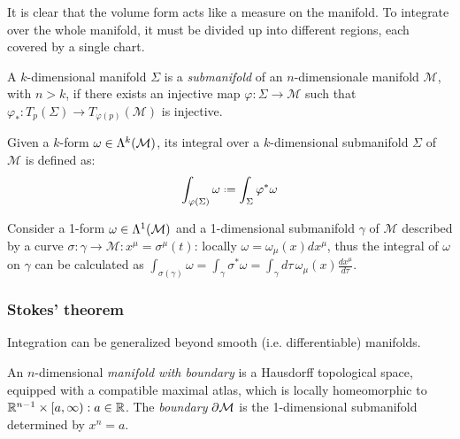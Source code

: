 It is clear that the volume form acts like a measure on the manifold. To integrate over the whole manifold, it must be divided up into different regions, each covered by a single chart.

\begin{definition}
  A $ k $-dimensional manifold $ \Sigma $ is a \textit{submanifold} of an $ n $-dimensionale manifold $ \mathcal{M} $, with $ n > k $, if there exists an injective map $ \varphi : \Sigma \rightarrow \mathcal{M} $ such that $ \varphi_* : T_p(\Sigma) \rightarrow T_{\varphi(p)}(\mathcal{M}) $ is injective.
\end{definition}

\begin{definition}
  Given a $ k $-form $ \omega \in\Lambda^{k}(\mathcal{M}) $, its integral over a $ k $-dimensional submanifold $ \Sigma $ of $ \mathcal{M} $ is defined as:
  \begin{equation}
    \int_{\varphi(\Sigma)} \omega \defeq \int_{\Sigma} \varphi^* \omega
    \label{eq:2.47}
  \end{equation}
\end{definition}

\begin{example}
  Consider a 1-form $ \omega \in\Lambda^{1}(\mathcal{M}) $ and a 1-dimensional submanifold $ \gamma $ of $ \mathcal{M} $ described by a curve $ \sigma : \gamma \rightarrow \mathcal{M}: x^{\mu} = \sigma^{\mu}(t) $: locally $ \omega = \omega_{\mu}(x) dx^{\mu} $, thus the integral of $ \omega $ on $ \gamma $ can be calculated as $ \int_{\sigma(\gamma)} \omega = \int_{\gamma} \sigma^* \omega = \int_{\gamma} d\tau \,\omega_{\mu}(x) \frac{dx^{\mu}}{d\tau} $.
\end{example}

\subsubsection{Stokes' theorem}

Integration can be generalized beyond smooth (i.e. differentiable) manifolds.

\begin{definition}
  An $ n $-dimensional \textit{manifold with boundary} is a Hausdorff topological space, equipped with a compatible maximal atlas, which is locally homeomorphic to $ \mathbb{R}^{n-1} \times [a,\infty) : a \in\mathbb{R} $.
  The \textit{boundary} $ \partial \mathcal{M} $ is the 1-dimensional submanifold determined by $ x^n = a $.
\end{definition}

